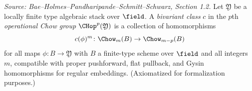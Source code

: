 \begin{definition}
  \label{def:operational_chow}
  \textit{Source: Bae--Holmes--Pandharipande--Schmitt--Schwarz, Section 1.2.}
  Let $\mathfrak{Y}$ be a locally finite type algebraic stack over $\field$.
  A \emph{bivariant class} $c$ in the $p$th \emph{operational Chow group}
  $\CHop^p(\mathfrak{Y})$ is a collection of homomorphisms
  \[
    c(\phi)^m \colon \Chow_m(B) \to \Chow_{m-p}(B)
  \]
  for all maps $\phi\colon B \to \mathfrak{Y}$ with $B$ a finite-type scheme over $\field$
  and all integers $m$, compatible with proper pushforward, flat pullback, and Gysin
  homomorphisms for regular embeddings.
  (Axiomatized for formalization purposes.)
\end{definition}

